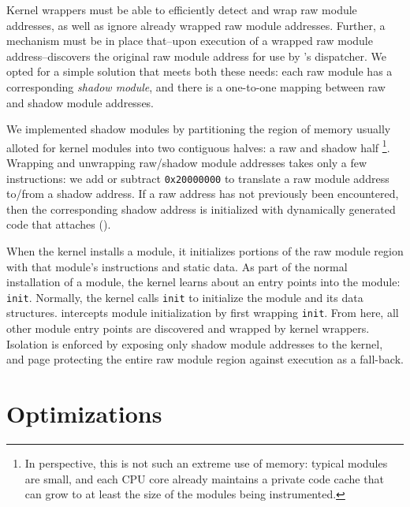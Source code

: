 \documentclass[10pt,preprint]{sigplanconf}
\begin{document}
Kernel wrappers must be able to efficiently detect and wrap raw module addresses, as well as ignore already wrapped raw module addresses. Further, a mechanism must be in place that--upon execution of a wrapped raw module address--discovers the original raw module address for use by {\sysname}'s dispatcher. We opted for a simple solution that meets both these needs: each raw module has a corresponding \emph{shadow module}, and there is a one-to-one mapping between raw and shadow module addresses.


We implemented shadow modules by partitioning the region of memory usually alloted for kernel modules into two contiguous halves: a raw and shadow half%
\footnote{In perspective, this is not such an extreme use of memory: typical modules are small, and each CPU core already maintains a private code cache that can grow to at least the size of the modules being instrumented.}. Wrapping and unwrapping raw/shadow module addresses takes only a few instructions: we add or subtract \texttt{0x20000000} to translate a raw module address to/from a shadow address. If a raw address has not previously been encountered, then the corresponding shadow address is initialized with dynamically generated code that attaches {\sysname} ().

When the kernel installs a module, it initializes portions of the raw module region with that module's instructions and static data. As part of the normal installation of a module, the kernel learns about an entry points into the module: \texttt{init}. Normally, the kernel calls \texttt{init} to initialize the module and its data structures. {\Sysname} intercepts module initialization by first wrapping \texttt{init}. From here, all other module entry points are discovered and wrapped by kernel wrappers. Isolation is enforced by exposing only shadow module addresses to the kernel, and page protecting the entire raw module region against execution as a fall-back.



\section{Optimizations}
\end{document}
